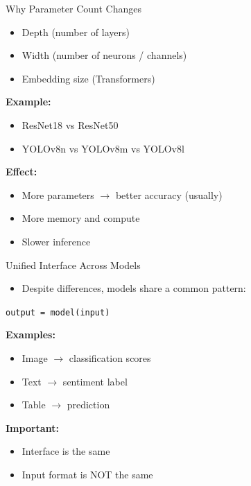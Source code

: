 \documentclass[aspectratio=169]{beamer}
\begin{document}
\begin{frame}[t]{Why Parameter Count Changes}
    \vspace*{-0.4cm}
\begin{itemize}
\item Depth (number of layers)
\item Width (number of neurons / channels)
\item Embedding size (Transformers)
\end{itemize}

\vspace{0.5em}

\textbf{Example:}
\begin{itemize}
\item ResNet18 vs ResNet50
\item YOLOv8n vs YOLOv8m vs YOLOv8l
\end{itemize}

\vspace{0.5em}

\textbf{Effect:}
\begin{itemize}
\item More parameters $\rightarrow$ better accuracy (usually)
\item More memory and compute
\item Slower inference
\end{itemize}
\end{frame}

\begin{frame}[t]{Unified Interface Across Models}
\begin{itemize}
\item Despite differences, models share a common pattern:
\end{itemize}

\begin{center}
\texttt{output = model(input)}
\end{center}


\textbf{Examples:}
\begin{itemize}
\item Image $\rightarrow$  classification scores
\item Text $\rightarrow$  sentiment label
\item Table $\rightarrow$  prediction
\end{itemize}

\vspace{0.5em}

\textbf{Important:}
\begin{itemize}
\item Interface is the same
\item Input format is NOT the same
\end{itemize}
\end{frame}
\end{document}
